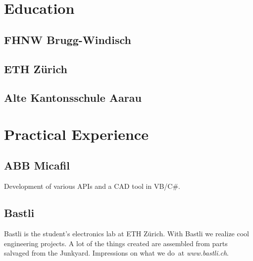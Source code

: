 \documentclass[]{resume}
\begin{document}
\begin{timeline}


\section{Education}

\subsection{FHNW Brugg-Windisch}
\sectionsep

\subsection{ETH Zürich}
\sectionsep

\subsection{Alte Kantonsschule Aarau}
\sectionsep


\section{Practical Experience}

\subsection{ABB Micafil}
Development of various APIs and a CAD tool in VB/C\#.
\sectionsep

\subsection{Bastli}
Bastli is the student's electronics lab at ETH Zürich.
With Bastli we realize cool engineering projects. A lot of the things created are assembled from parts salvaged from the Junkyard.
Impressions on what we do at \textit{www.bastli.ch}.
\sectionsep


\end{timeline}
\end{document}
